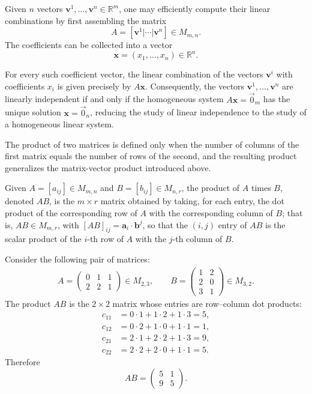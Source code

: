 \begin{example}
Given $n$ vectors $\mathbf{v}^1, \dots, \mathbf{v}^n \in \mathbb{R}^m$, one may efficiently compute their linear combinations by first assembling the matrix
\[
A = [\mathbf{v}^1 | \cdots | \mathbf{v}^n] \in M_{m,n}.
\]
The coefficients can be collected into a vector
\[
\mathbf{x} = (x_1, \dots, x_n) \in \mathbb{R}^n.
\]

For every such coefficient vector, the linear combination of the vectors $\mathbf{v}^i$ with coefficients $x_i$ is given precisely by $A\mathbf{x}$. Consequently, the vectors $\mathbf{v}^1, \dots, \mathbf{v}^n$ are linearly independent if and only if the homogeneous system $A\mathbf{x} = \vec{0}_m$ has the unique solution $\mathbf{x} = \vec{0}_n$, reducing the study of linear independence to the study of a homogeneous linear system.
\end{example}

The product of two matrices is defined only when the number of columns of the first matrix equals the number of rows of the second, and the resulting product generalizes the matrix-vector product introduced above.

\begin{definition}
Given $A = [a_{ij}] \in M_{m,n}$ and $B = [b_{ij}] \in M_{n,r}$, the product of $A$ times $B$, denoted $AB$, is the $m \times r$ matrix obtained by taking, for each entry, the dot product of the corresponding row of $A$ with the corresponding column of $B$; that is, $AB \in M_{m,r}$, with $[AB]_{ij} = \mathbf{a}_i \cdot \mathbf{b}^j$, so that the $(i,j)$ entry of $AB$ is the scalar product of the $i$-th row of $A$ with the $j$-th column of $B$.
\end{definition}

\begin{example}
Consider the following pair of matrices:
\[
\begin{gathered}
A = \begin{pmatrix} 0 & 1 & 1 \\ 2 & 2 & 1 \end{pmatrix} \in M_{2,3}, \qquad
B = \begin{pmatrix} 1 & 2 \\ 2 & 0 \\ 3 & 1 \end{pmatrix} \in M_{3,2}.
\end{gathered}
\]
The product $AB$ is the $2\times2$ matrix whose entries are row--column
dot products:
\[
\begin{aligned}
c_{11}&=0\cdot1+1\cdot2+1\cdot3=5,\\
c_{12}&=0\cdot2+1\cdot0+1\cdot1=1,\\
c_{21}&=2\cdot1+2\cdot2+1\cdot3=9,\\
c_{22}&=2\cdot2+2\cdot0+1\cdot1=5.
\end{aligned}
\]
Therefore
\[
AB=\begin{pmatrix}5&1\\9&5\end{pmatrix}.
\]

\end{example}

